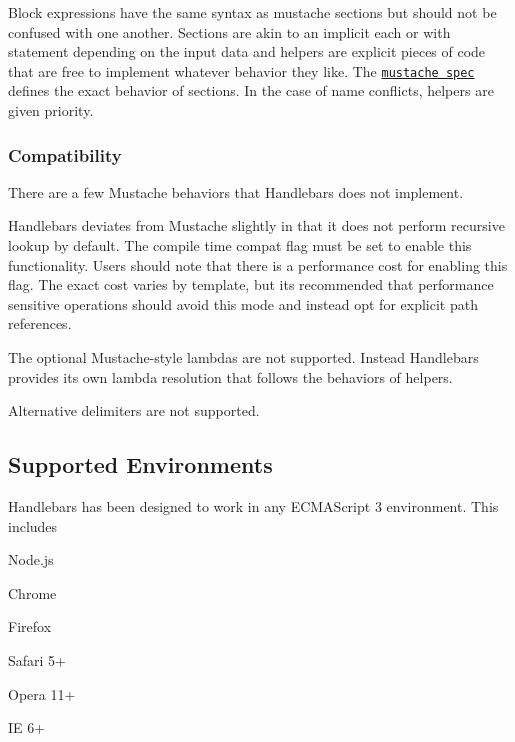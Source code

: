 Block expressions have the same syntax as mustache sections but should not be confused with one another. Sections are akin to an implicit {\ttfamily each} or {\ttfamily with} statement depending on the input data and helpers are explicit pieces of code that are free to implement whatever behavior they like. The \href{http://mustache.github.io/mustache.5.html}{\tt mustache spec} defines the exact behavior of sections. In the case of name conflicts, helpers are given priority.

\subsubsection*{Compatibility}

There are a few Mustache behaviors that Handlebars does not implement.
\begin{DoxyItemize}
\item Handlebars deviates from Mustache slightly in that it does not perform recursive lookup by default. The compile time {\ttfamily compat} flag must be set to enable this functionality. Users should note that there is a performance cost for enabling this flag. The exact cost varies by template, but it\textquotesingle{}s recommended that performance sensitive operations should avoid this mode and instead opt for explicit path references.
\item The optional Mustache-\/style lambdas are not supported. Instead Handlebars provides its own lambda resolution that follows the behaviors of helpers.
\item Alternative delimiters are not supported.
\end{DoxyItemize}

\subsection*{Supported Environments }

Handlebars has been designed to work in any E\+C\+M\+A\+Script 3 environment. This includes


\begin{DoxyItemize}
\item Node.\+js
\item Chrome
\item Firefox
\item Safari 5+
\item Opera 11+
\item I\+E 6+
\end{DoxyItemize}

